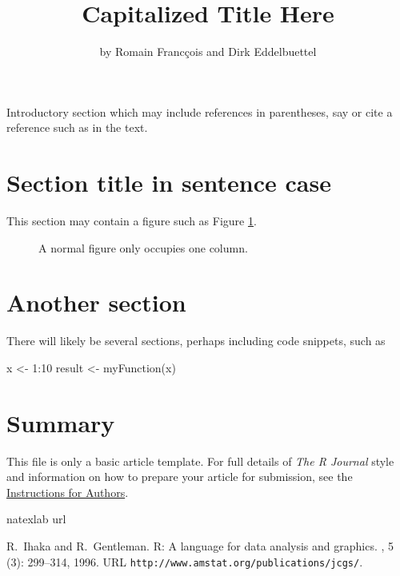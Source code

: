 \title{Capitalized Title Here}
\author{by Romain Franc\c{c}ois and Dirk Eddelbuettel}

\maketitle


Introductory section which may include references in parentheses, say
\citep{R:Ihaka+Gentleman:1996} or cite a reference such as
\citet{R:Ihaka+Gentleman:1996} in the text.

\section{Section title in sentence case}

This section may contain a figure such as Figure \ref{figure:onecolfig}.

\begin{figure}
\vspace*{.1in}
\caption{\label{figure:onecolfig}
A normal figure only occupies one column.}
\end{figure}

\section{Another section}

There will likely be several sections, perhaps including code snippets, such
as
\begin{example}
  x <- 1:10
  result <- myFunction(x)
\end{example}

\section{Summary}

This file is only a basic article template. For full details of \emph{The R Journal}
style and information on how to prepare your article for submission, see the
\href{http://journal.r-project.org/latex/RJauthorguide.pdf}{Instructions for Authors}.

%

\begin{thebibliography}{1}
\expandafter\ifx\csname natexlab\endcsname\relax\def\natexlab#1{#1}\fi
\expandafter\ifx\csname url\endcsname\relax
  \def\url#1{{\tt #1}}\fi

R.~Ihaka and R.~Gentleman.
\newblock R: A language for data analysis and graphics.
, 5
  (3): 299--314, 1996.
\newblock URL \url{http://www.amstat.org/publications/jcgs/}.

\end{thebibliography}

